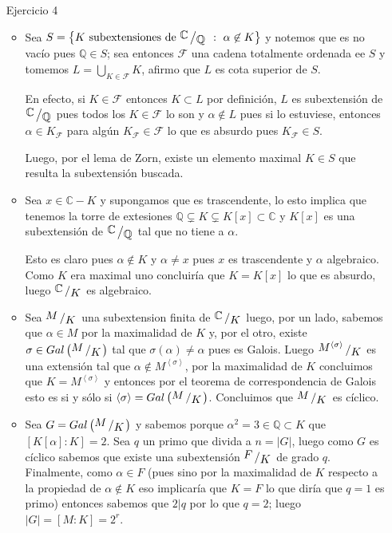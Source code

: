 \documentclass[11pt]{article}
\newcommand{\F}{\mathcal{F}}
\newcommand{\C}{\mathbb{C}}
\newcommand{\Q}{\mathbb{Q}}
\newcommand\tq{~:~}
\newcommand{\abs}[1]{\left\lvert#1\right\rvert}
\newcommand{\ip}[1]{\left\langle#1\right\rangle}
\newcommand{\sett}[1]{\left\lbrace#1\right\rbrace}
\newcommand{\Bigcup}[2]{\bigcup\limits_{#1}{#2}}
\newcommand{\quotient}[2]{{\raisebox{.2em}{$#1$}\left/\raisebox{-.2em}{$#2$}\right.}}
\numberwithin{theorem}{subsection}
\newcommand{\qed}{\nobreak \ifvmode \relax \else
	\ifdim\lastskip<1.5em \hskip-\lastskip
	\hskip1.5em plus0em minus0.5em \fi \nobreak
	\vrule height0.75em width0.5em depth0.25em\fi}
\begin{document}
\begin{enumerate}
\begin{itemize}
		Luego, $[\Q[\sqrt[p]{5}, \xi_n]:\Q[\sqrt[p]{5}]] = \varphi(n)$ para este caso tambi\'en y entonces conclu\'imos que $\Phi_n$ resulta irreducible en $Q[\sqrt[p]{5}]$ para todo $p>2$.\qed 
		
	\end{itemize}
	
	\item[Ejercicio 4]
	
	\begin{itemize}
		\item Sea $S = \sett{K \text{ subextensiones de } \quotient{\C}{\Q} \tq \alpha \not \in K}$ y notemos que es no vac\'io pues $\Q \in S$; sea entonces $\F$ una cadena totalmente ordenada ee $S$ y tomemos $L = \Bigcup{K \in \F}{K}$, afirmo que $L$ es cota superior de $S$.
		
		En efecto, si $K \in \F$ entonces $K \subset L$ por definici\'on, $L$ es subextensi\'on de $\quotient{\C}{\Q}$ pues todos los $K \in \F$ lo son y $\alpha \not \in L$ pues si lo estuviese, entonces $\alpha \in K_{\F}$ para alg\'un $K_{\F} \in \F$ lo que es absurdo pues $K_{\F} \in S$.
	
		Luego, por el lema de Zorn, existe un elemento maximal $K \in S$ que resulta la subextensi\'on buscada.
		
		\item Sea $x \in \C - K$ y supongamos que es trascendente, lo esto implica que tenemos la torre de extesiones $\Q \subsetneq K \subsetneq K[x] \subset \C$ y $K[x]$ es una subextensi\'on de $\quotient{\C}{\Q}$ tal que no tiene a $\alpha$.
		
		Esto es claro pues $\alpha \not \in K$ y $\alpha \neq x$ pues $x$ es trascendente y $\alpha$ algebraico. Como $K$ era maximal uno concluir\'ia que $K = K[x]$ lo que es absurdo, luego $\quotient{\C}{K}$ es algebraico.
	
		\item Sea $\quotient{M}{K}$ una subextension finita de $\quotient{\C}{K}$ luego, por un lado, sabemos que $\alpha \in M$ por la maximalidad de $K$ y, por el otro, existe  $\sigma \in Gal\left(\quotient{M}{K}\right)$ tal que $\sigma(\alpha) \neq \alpha$ pues es Galois. Luego $\quotient{M^{\ip{\sigma}}}{K}$ es una extensi\'on tal que $\alpha \not \in M^{\ip{\sigma}}$, por la maximalidad de $K$ concluimos que $K = M^{\ip{\sigma}}$ y entonces por el teorema de correspondencia de Galois esto es si y s\'olo si $\ip{\sigma} = Gal\left(\quotient{M}{K}\right)$. Concluimos que $\quotient{M}{K}$ es c\'iclico.
	
		\item Sea $G = Gal\left(\quotient{M}{K}\right)$ y sabemos porque $\alpha^2 = 3 \in \Q \subset K$ que $[K[\alpha]:K] = 2$. Sea $q$ un primo que divida a $n = \abs{G}$, luego como $G$ es c\'iclico sabemos que existe una subextensi\'on $\quotient{F}{K}$ de grado $q$. Finalmente, como $\alpha \in F$ (pues sino por la maximalidad de $K$ respecto a la propiedad de $\alpha \not \in K$ eso implicar\'ia que $K=F$ lo que dir\'ia que $q=1$ es primo) entonces sabemos que $2 \vert q$ por lo que $q = 2$; luego $\abs{G} = [M:K] = 2^r$.
		

\end{itemize}
\end{enumerate}
\end{document}
